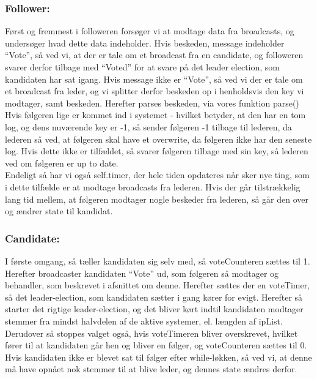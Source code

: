 \documentclass[a4paper,12pt]{article}
\begin{document}
\subsubsection{Follower:}
Først og fremmest i followeren forsøger vi at modtage data fra broadcasts, og undersøger hvad dette data indeholder.
Hvis beskeden, message indeholder “Vote”, så ved vi, at der er tale om et broadcast fra en candidate, og followeren svarer derfor tilbage med “Voted” for at svare på det leader election, som kandidaten har sat igang.
Hvis message ikke er “Vote”, så ved vi der er tale om et broadcast fra leder, og vi splitter derfor beskeden op i henholdsvis den key vi modtager, samt beskeden.
Herefter parses beskeden, via vores funktion parse() 
Hvis følgeren lige er kommet ind i systemet - hvilket betyder, at den har en tom log, og dens nuværende key er -1, så sender følgeren -1 tilbage til lederen, da lederen så ved, at følgeren skal have et overwrite, da følgeren ikke har den seneste log.
Hvis dette ikke er tilfældet, så svarer følgeren tilbage med sin key, så lederen ved om følgeren er up to date.
\\
Endeligt så har vi også self.timer, der hele tiden opdateres når sker nye ting, som i dette tilfælde er at modtage broadcasts fra lederen.
Hvis der går tilstrækkelig lang tid mellem, at følgeren modtager nogle beskeder fra lederen, så går den over og ændrer state til kandidat.


\subsubsection{Candidate:}
I første omgang, så tæller kandidaten sig selv med, så voteCounteren sættes til 1.
Herefter broadcaster kandidaten “Vote” ud, som følgeren så modtager og behandler, som beskrevet i afsnittet om denne.
Herefter sættes der en voteTimer, så det leader-election, som kandidaten sætter i gang kører for evigt.
Herefter så starter det rigtige leader-election, og det bliver kørt indtil kandidaten modtager stemmer fra mindst halvdelen af de aktive systemer, el. længden af ipList. Derudover så stoppes valget også, hvis voteTimeren bliver overskrevet, hvilket fører til at kandidaten går hen og bliver en følger, og voteCounteren sættes til 0.
Hvis kandidaten ikke er blevet sat til følger efter while-løkken, så ved vi, at denne må have opnået nok stemmer til at blive leder, og dennes state ændres derfor.
\end{document}
